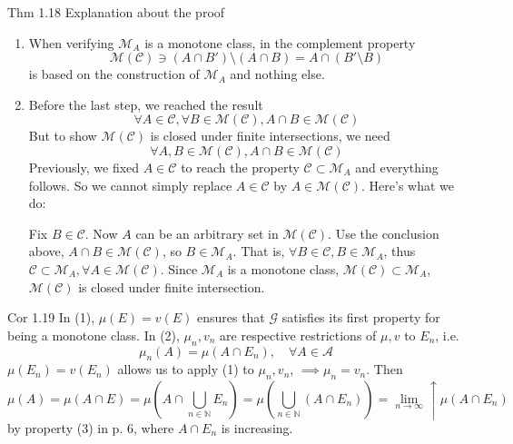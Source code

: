 \begin{note}{Thm 1.18}
    Explanation about the proof
    \begin{enumerate}
        \item When verifying $\mathcal{M}_A$ is a monotone class, in the complement property
        \[
        \mathcal{M}(\mathcal{C})\ni(A\cap B')\setminus (A\cap B)=A\cap(B'\setminus B)
        \]
        is based on the construction of $\mathcal{M}_A$ and nothing else.
        \item Before the last step, we reached the result
        \[
        \forall A\in \mathcal{C},\forall B\in \mathcal{M}(\mathcal{C}),A\cap B\in \mathcal{M}(\mathcal{C})
        \]
        But to show $\mathcal{M}(\mathcal{C})$ is closed under finite intersections, we need 
        \[
        \forall A,B\in \mathcal{M}(\mathcal{C}),A\cap B\in \mathcal{M}(\mathcal{C})
        \]
        Previously, we fixed $A\in \mathcal{C}$ to reach the property $\mathcal{C}\subset \mathcal{M}_A$ and everything follows. So we cannot simply replace $A\in \mathcal{C}$ by $A\in \mathcal{M}(\mathcal{C})$. Here's what we do:

        Fix $B\in \mathcal{C}$. Now $A$ can be an arbitrary set in $\mathcal{M}(\mathcal{C})$. Use the conclusion above, $A\cap B\in \mathcal{M}(\mathcal{C})$, so $B\in \mathcal{M}_A$. That is, $\forall B\in \mathcal{C}, B\in \mathcal{M}_A$, thus $\mathcal{C}\subset \mathcal{M}_A,\forall A\in\mathcal{M}(\mathcal{C})$. Since $\mathcal{M}_A$ is a monotone class, $\mathcal{M}(\mathcal{C})\subset \mathcal{M}_A$, $\mathcal{M}(\mathcal{C})$ is closed under finite intersection.
    \end{enumerate}
\end{note}

\begin{note}{Cor 1.19}
    In (1), $\mu(E) = v(E)$ ensures that $\mathcal{G}$ satisfies its first property for being a monotone class. In (2), $\mu_n,v_n$ are respective restrictions of $\mu,v$ to $E_n$, i.e. 
    \[\mu_n(A)=\mu(A\cap E_n),\quad \forall A\in \mathcal{A}\]
    $\mu(E_n)=v(E_n)$ allows us to apply (1) to $\mu_n,v_n$, $\implies \mu_n=v_n$. Then
    \[
    \mu(A)=\mu(A\cap E)=\mu\left(A\cap \bigcup_{n\in\mathbb{N}}E_n\right)=\mu\left(\bigcup_{n\in\mathbb{N}}(A\cap E_n)\right)=\lim_{n\to\infty}\uparrow \mu(A\cap E_n)
    \]
    by property (3) in p. 6, where $A\cap E_n$ is increasing.
\end{note}